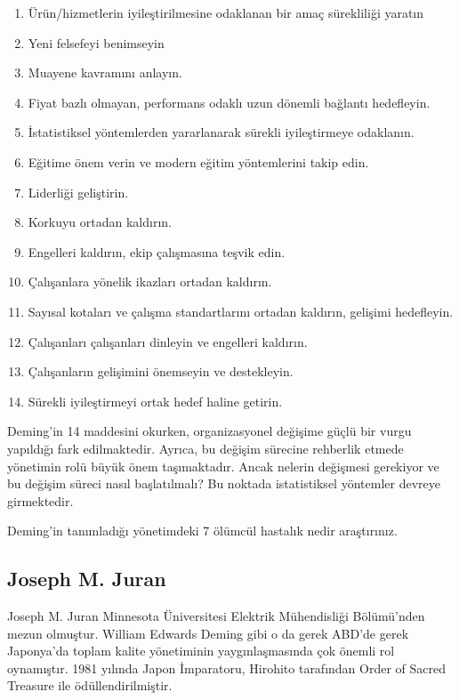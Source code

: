 \documentclass[
]{book}
\begin{document}
\begin{enumerate}
\def\labelenumi{\arabic{enumi}.}
\item
  Ürün/hizmetlerin iyileştirilmesine odaklanan bir amaç sürekliliği yaratın
\item
  Yeni felsefeyi benimseyin
\item
  Muayene kavramını anlayın.
\item
  Fiyat bazlı olmayan, performans odaklı uzun dönemli bağlantı hedefleyin.
\item
  İstatistiksel yöntemlerden yararlanarak sürekli iyileştirmeye odaklanın.
\item
  Eğitime önem verin ve modern eğitim yöntemlerini takip edin.
\item
  Liderliği geliştirin.
\item
  Korkuyu ortadan kaldırın.
\item
  Engelleri kaldırın, ekip çalışmasına teşvik edin.
\item
  Çalışanlara yönelik ikazları ortadan kaldırın.
\item
  Sayısal kotaları ve çalışma standartlarını ortadan kaldırın, gelişimi hedefleyin.
\item
  Çalışanları çalışanları dinleyin ve engelleri kaldırın.
\item
  Çalışanların gelişimini önemseyin ve destekleyin.
\item
  Sürekli iyileştirmeyi ortak hedef haline getirin.
\end{enumerate}

Deming'in 14 maddesini okurken, organizasyonel değişime güçlü bir vurgu yapıldığı fark edilmaktedir. Ayrıca, bu değişim sürecine rehberlik etmede yönetimin rolü büyük önem taşımaktadır. Ancak nelerin değişmesi gerekiyor ve bu değişim süreci nasıl başlatılmalı? Bu noktada istatistiksel yöntemler devreye girmektedir.

{Deming'in tanımladığı yönetimdeki 7 ölümcül hastalık nedir araştırınız.}

\hypertarget{joseph-m.-juran}{%
\subsection{Joseph M. Juran}\label{joseph-m.-juran}}

Joseph M. Juran Minnesota Üniversitesi Elektrik Mühendisliği Bölümü'nden mezun olmuştur. William Edwards Deming gibi o da gerek ABD'de gerek Japonya'da toplam kalite yönetiminin yaygınlaşmasında çok önemli rol oynamıştır. 1981 yılında Japon İmparatoru, Hirohito tarafından Order of Sacred Treasure ile ödüllendirilmiştir.
\end{document}
